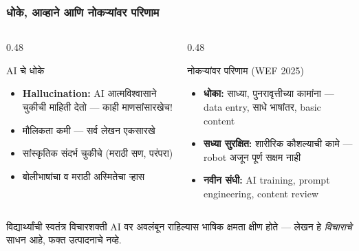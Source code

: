 \begin{frame}[fragile]\frametitle{धोके, आव्हाने आणि नोकऱ्यांवर परिणाम}

\begin{columns}[T]
\begin{column}{0.48\textwidth}
\begin{alertblock}{AI चे धोके}
\begin{itemize}
\item \textbf{Hallucination:} AI आत्मविश्वासाने चुकीची माहिती देतो — काही माणसांसारखेच!
\item मौलिकता कमी — सर्व लेखन एकसारखे
\item सांस्कृतिक संदर्भ चुकीचे (मराठी सण, परंपरा)
\item बोलीभाषांचा व मराठी अस्मितेचा ऱ्हास
\end{itemize}
\end{alertblock}
\end{column}
\begin{column}{0.48\textwidth}
\begin{block}{नोकऱ्यांवर परिणाम (WEF 2025)}
\begin{itemize}
\item \textbf{धोका:} साध्या, पुनरावृत्तीच्या कामांना — data entry, साधे भाषांतर, basic content
\item \textbf{सध्या सुरक्षित:} शारीरिक कौशल्याची कामे — robot अजून पूर्ण सक्षम नाही
\item \textbf{नवीन संधी:} AI training, prompt engineering, content review
\end{itemize}
\end{block}
\end{column}
\end{columns}

\vspace{0.2cm}
\begin{exampleblock}{विद्यार्थ्यांची स्वतंत्र विचारशक्ती}
AI वर अवलंबून राहिल्यास भाषिक क्षमता क्षीण होते — लेखन हे \textit{विचाराचे} साधन आहे, फक्त उत्पादनाचे नव्हे.
\end{exampleblock}


\end{frame}

